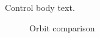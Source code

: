 \documentclass{article}
\begin{document}
Control body text.
\begin{figure}
\caption{Orbit comparison}
\end{figure}
\begin{table}
\caption{Engine comparison}
\end{table}
\end{document}
